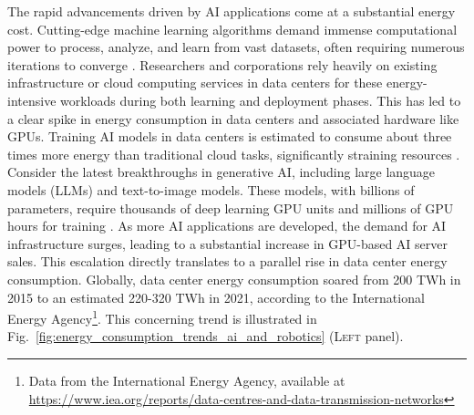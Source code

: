 \documentclass[12pt]{article}
\begin{document}
The rapid advancements driven by AI applications come at a substantial energy cost. Cutting-edge machine learning algorithms demand immense computational power to process, analyze, and learn from vast datasets, often requiring numerous iterations to converge \cite{Strubell2019EnergyPolicyConsiderations}. Researchers and corporations rely heavily on existing infrastructure or cloud computing services in data centers for these energy-intensive workloads during both learning and deployment phases. This has led to a clear spike in energy consumption in data centers and associated hardware like GPUs. Training AI models in data centers is estimated to consume about three times more energy than traditional cloud tasks, significantly straining resources \cite{Thomas2023cloudusesmassive}. Consider the latest breakthroughs in generative AI, including large language models (LLMs) and text-to-image models. These models, with billions of parameters, require thousands of deep learning GPU units and millions of GPU hours for training \cite{Vanian2023ChatGPTgenerativeAI, Corbyn2023Nvidiachipmaker}. As more AI applications are developed, the demand for AI infrastructure surges, leading to a substantial increase in GPU-based AI server sales. This escalation directly translates to a parallel rise in data center energy consumption. Globally, data center energy consumption soared from 200 TWh in 2015 to an estimated 220-320 TWh in 2021, according to the International Energy Agency\footnote{Data from the International Energy Agency, available at \url{https://www.iea.org/reports/data-centres-and-data-transmission-networks}}. This concerning trend is illustrated in Fig.~\ref{fig:energy_consumption_trends_ai_and_robotics} (\textsc{Left} panel).
\end{document}

